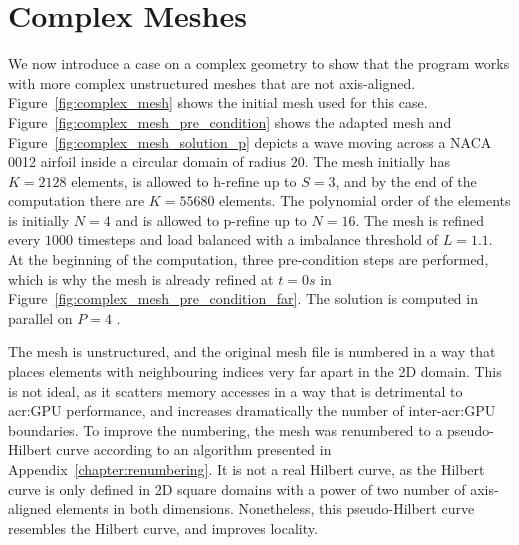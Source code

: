 \section{Complex Meshes}\label{section:results:complex_meshes}

We now introduce a case on a complex geometry to show that the program works with more complex
unstructured meshes that are not axis-aligned. Figure~\ref{fig:complex_mesh} shows the initial mesh
used for this case. Figure~\ref{fig:complex_mesh_pre_condition} shows the adapted mesh and
Figure~\ref{fig:complex_mesh_solution_p} depicts a wave moving across a NACA 0012 airfoil inside a
circular domain of radius \(20\). The mesh initially has \(K = 2128\) elements, is allowed to
h-refine up to \(S = 3\), and by the end of the computation there are \(K = 55680\) elements. The
polynomial order of the elements is initially \(N = 4\) and is allowed to p-refine up to \(N = 16\).
The mesh is refined every \(1000\) timesteps and load balanced with a imbalance threshold of \(L =
1.1\). At the beginning of the computation, three pre-condition steps are performed, which is why
the mesh is already refined at \(t = 0 s\) in Figure~\ref{fig:complex_mesh_pre_condition_far}. The
solution is computed in parallel on \(P = 4\) .

The mesh is unstructured, and the original mesh file is numbered in a way that places elements with
neighbouring indices very far apart in the 2D domain. This is not ideal, as it scatters memory
accesses in a way that is detrimental to \acrshort{acr:GPU} performance, and increases dramatically
the number of inter-\acrshort{acr:GPU} boundaries. To improve the numbering, the mesh was renumbered
to a pseudo-Hilbert curve according to an algorithm presented in Appendix~\ref{chapter:renumbering}.
It is not a real Hilbert curve, as the Hilbert curve is only defined in 2D square domains with a
power of two number of axis-aligned elements in both dimensions. Nonetheless, this pseudo-Hilbert
curve resembles the Hilbert curve, and improves locality.

